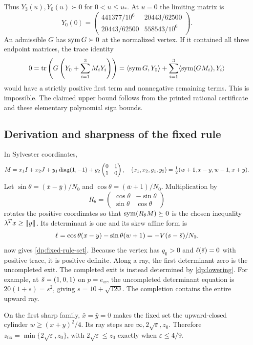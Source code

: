 Thus $Y_3(u),Y_0(u)\succ0$ for $0<u\le u_*$.
At $u=0$ the limiting matrix is
\[
 Y_0(0)=\begin{pmatrix}441377/10^6&20443/62500\\20443/62500&558543/10^6\end{pmatrix}.
\]
An admissible $G$ has $\operatorname{sym} G\succ0$ at the normalized vertex.
If it contained all three endpoint matrices, the trace identity
\[
 0=\operatorname{tr}\left(G\left(Y_0+\sum_{i=1}^3M_iY_i\right)\right)
   =\langle\operatorname{sym} G,Y_0\rangle+\sum_{i=1}^3\langle\operatorname{sym}(GM_i),Y_i\rangle
\]
would have a strictly positive first term and nonnegative remaining terms.
This is impossible. The claimed upper bound follows from the printed
rational certificate and these elementary polynomial sign bounds.

\subsection{Derivation and sharpness of the fixed rule}\label{dp:fixed-rule-derivation}

In Sylvester coordinates,
\[
 M=x_1I+x_2J+y_1\operatorname{diag}(1,-1)+y_2
       \begin{pmatrix}0&1\\1&0\end{pmatrix},\quad
 (x_1,x_2,y_1,y_2)=\tfrac12(w+1,x-y,w-1,x+y).
\]
Let $\sin\theta=(\bar x-\bar y)/N_0$ and
$\cos\theta=(\bar w+1)/N_0$. Multiplication by
\[
 R_\theta=\begin{pmatrix}\cos\theta&-\sin\theta\\
                         \sin\theta&\cos\theta\end{pmatrix}
\]
rotates the positive coordinates so that
$\operatorname{sym}(R_\theta M)\succeq0$ is the chosen inequality
$\lambda^Tx\ge\lVert y\rVert$. Its determinant is one and its skew affine form is
\[
 \ell=\cos\theta(x-y)-\sin\theta(w+1)
     =-V(s-\bar s)/N_0.
\]
 now gives \cref{dp:fixed-rule-set}.
Because the vertex has $q_0>0$ and $\ell(\bar s)=0$ with positive trace,
it is positive definite. Along a ray, the first determinant zero is the
uncompleted exit. The completed exit is instead determined by
\cref{dp:lowering}. For example, at $\bar s=(1,0,1)$ on $p=e_w$,
the uncompleted determinant equation is $20(1+s)=s^2$, giving
$s=10+\sqrt{120}$. The completion contains the entire upward ray.

On the first sharp family, $\bar x=\bar y=0$ makes the fixed set the
upward-closed cylinder $w\ge(x+y)^2/4$. Its ray steps are
$\infty,2\sqrt\varepsilon,z_0$. Therefore
$z_{\mathrm{fix}}=\min\{2\sqrt\varepsilon,z_0\}$, with
$2\sqrt\varepsilon\le z_0$ exactly when $\varepsilon\le4/9$.

